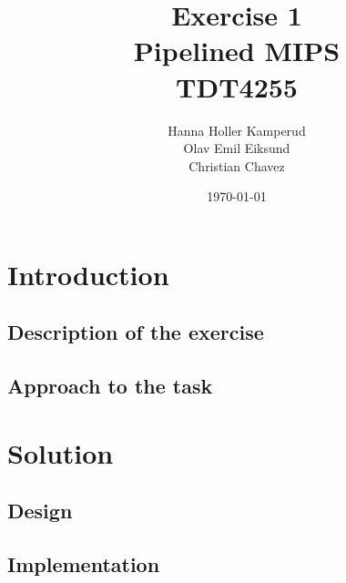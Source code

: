 \documentclass{report}
\title{Exercise 1 \\ Pipelined MIPS \\ TDT4255} %
\author{Hanna Holler Kamperud \\ Olav Emil Eiksund \\ Christian Chavez} %
\date{\today} %
\begin{document}
\maketitle %

\newpage
\begin{abstract}

\end{abstract}

\tableofcontents


\chapter{Introduction}
\section{Description of the exercise}


\section{Approach to the task}


\chapter{Solution}


\section{Design}


\section{Implementation}


\newpage
\end{document}
